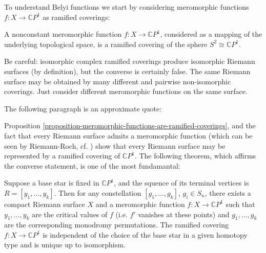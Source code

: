 To understand Belyi functions we start by considering meromorphic functions
$f:X\to \mathbb{C}P^{1}$ as ramified coverings:

\begin{proposition}
\label{proposition-meromorphic-functions-are-ramified-coverings}
\begin{reference}
\cite[Proposition 1.8.9]{lando}
\end{reference}
A nonconstant meromorphic function $f:X\to\mathbb{C}P^{1}$, considered as a
mapping of the underlying topological space, is a ramified covering of the
sphere $S^2\cong\mathbb{C}P^{1}$.
\end{proposition}

Be careful: isomorphic complex ramified coverings produce isomorphic Riemann
surfaces (by definition), but the converse is certainly false. The same Riemann
surface may be obtained by many different and pairwise non-isomorphic coverings.
Just consider different meromorphic functions on the same surface.

\medskip\noindent

The following paragraph is an approximate quote:

Proposition \ref{proposition-meromorphic-functions-are-ramified-coverings}, and
the fact that every Riemann surface admits a meromorphic function (which can be
seen by Riemann-Roch, cf. \cite[Fact 1.8.6]{lando}) show that every Riemann
surface may be represented by a ramified covering of $\mathbb{C}P^{1}$. The
following theorem, which affirms the converse statement, is one of the most
fundamantal:

\begin{theorem}
\label{theorem-Riemann-existence}
\begin{reference}
\cite[Theorem 1.8.14]{lando}
\end{reference}
Suppose a base star is fixed in $\mathbb{C}P^{1}$, and the squence of its
terminal vertices is $R=[y_1,\ldots,y_k]$. Then for any constellation
$[g_1,\ldots,g_k]$, $g_i \in S_n$, there exists a compact Riemann surface $X$
and a meromorphic function $f:X \to \mathbb{C}P^{1}$ such that $y_1,\ldots,y_k$
are the critical values of $f$ (i.e. $f'$ vanishes at these points) and
$g_1,\ldots,g_k$ are the corresponding monodromy permutations. The ramified
covering $f:X\to \mathbb{C}P^{1}$ is independent of the choice of the base star
in a given homotopy type and is unique up to isomorphism.
\end{theorem}

